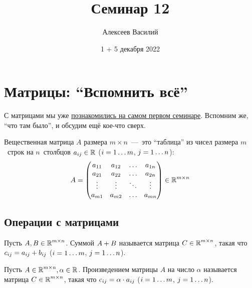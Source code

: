 \documentclass[a4paper,12pt]{article}
\author{Алексеев Василий}
\title{Семинар 12}
\date{1 + 5 декабря 2022}
\theoremstyle{remark}
\begin{document}
  \maketitle
  
  {
    \hypersetup{linkcolor=my-blue}
    \tableofcontents
  }

  \thispagestyle{empty}
  
  \newpage
  


  \section{Матрицы: ``Вспомнить всё''}
  
  С матрицами мы уже \href{https://github.com/Alvant/GeomeSeminare/tree/master2022/seminars/geome/seminar01}{познакомились на самом первом семинаре}.
  Вспомним же, ``что там было'', и обсудим ещё кое-что сверх.
  
  \bigskip
  
  Вещественная матрица $A$ размера $m \times n$~---~это ``таблица'' из чисел размера $m$~строк на $n$~столбцов $a_{ij} \hm\in \RR$ ($i \hm= 1 \ldots m$, $j \hm= 1 \ldots n$):
  \[
    A = \begin{pmatrix}
      a_{11} & a_{12} & \ldots & a_{1n}\\
      a_{21} & a_{22} & \ldots & a_{2n}\\
      \vdots & \vdots & \ddots & \vdots\\
      a_{m1} & a_{m2} & \ldots & a_{mn}
    \end{pmatrix} \in \operatorname{\mathbb R}^{m \times n}
  \]
  
  
  \subsection{Операции с матрицами}
  
  \begin{definition}
    Пусть $A, B \in \operatorname{\mathbb R}^{m \times n}$.
    Суммой $A \hm+ B$ называется матрица $C \hm\in \RR^{m \times n}$, такая что
    $c_{ij} \hm= a_{ij} + b_{ij}$ ($i \hm= 1 \ldots m$, $j \hm= 1 \ldots n$).
  \end{definition}
  
  \begin{definition}
    Пусть $A \in \operatorname{\mathbb R}^{m \times n}, \alpha \in \operatorname{\mathbb R}$.
    Произведением матрицы $A$ на число $\alpha$ называется матрица $C \hm\in \RR^{m \times n}$, такая что
    $c_{ij} \hm= \alpha \cdot a_{ij}$ ($i \hm= 1 \ldots m$, $j \hm= 1 \ldots n$).
  \end{definition}
  
\end{document}
